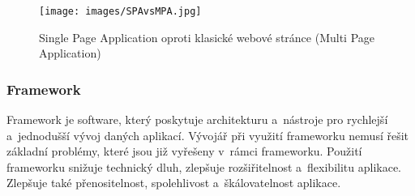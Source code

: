 \begin{figure}[htb]
	\centering
		\texttt{[image: images/SPAvsMPA.jpg]}
	\caption[Single Page Application oproti klasické webové stránce (Multi Page Application)]{Single Page Application oproti klasické webové stránce (Multi Page Application) \cite{fergusonspavsmpa}}
	\label{fig:spavsmpa}
\end{figure}

\subsubsection*{Framework}

Framework je software, který poskytuje architekturu a~nástroje pro rychlejší a~jednodušší vývoj daných aplikací. 
Vývojář při využití frameworku nemusí řešit základní problémy, které jsou již vyřešeny v~rámci frameworku. 
Použití frameworku snižuje technický dluh, zlepšuje rozšiřitelnost a~flexibilitu aplikace. 
Zlepšuje také přenositelnost, spolehlivost a~škálovatelnost aplikace.\cite{schmidtframeworks}